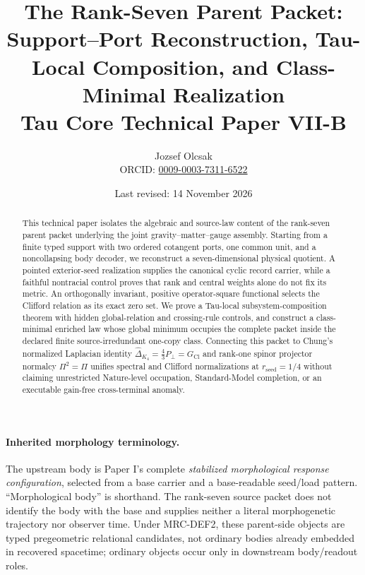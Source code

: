 \documentclass[11pt]{article}
\title{The Rank-Seven Parent Packet:\\Support--Port Reconstruction, Tau-Local Composition, and Class-Minimal Realization\\
\large Tau Core Technical Paper VII-B}
\author{Jozsef Olcsak\\{\small ORCID: \href{https://orcid.org/0009-0003-7311-6522}{0009-0003-7311-6522}}}
\date{Last revised: 14 November 2026}
\begin{document}
\maketitle

\begin{abstract}
This technical paper isolates the algebraic and source-law content of the rank-seven parent packet underlying the joint gravity--matter--gauge assembly. Starting from a finite typed support with two ordered cotangent ports, one common unit, and a noncollapsing body decoder, we reconstruct a seven-dimensional physical quotient. A pointed exterior-seed realization supplies the canonical cyclic record carrier, while a faithful nontracial control proves that rank and central weights alone do not fix its metric. An orthogonally invariant, positive operator-square functional selects the Clifford relation as its exact zero set. We prove a Tau-local subsystem-composition theorem with hidden global-relation and crossing-rule controls, and construct a class-minimal enriched law whose global minimum occupies the complete packet inside the declared finite source-irredundant one-copy class. Connecting this packet to Chung's normalized Laplacian identity \(\widehat{\Delta}_{K_4}=\frac{4}{3}P_\perp=G_{\mathrm{Cl}}\) and rank-one spinor projector normalcy \(\Pi^2=\Pi\) unifies spectral and Clifford normalizations at \(r_{\mathrm{seed}}=1/4\) without claiming unrestricted Nature-level occupation, Standard-Model completion, or an executable gain-free cross-terminal anomaly.
\end{abstract}

\paragraph{Inherited morphology terminology.}
The upstream body is Paper I's complete \emph{stabilized morphological
response configuration}, selected from a base carrier and a base-readable
seed/load pattern.  ``Morphological body'' is shorthand.  The rank-seven
source packet does not identify the body with the base and supplies neither a
literal morphogenetic trajectory nor observer time.
Under MRC-DEF2, these parent-side objects are typed pregeometric relational
candidates, not ordinary bodies already embedded in recovered spacetime;
ordinary objects occur only in downstream body/readout roles.
\end{document}
